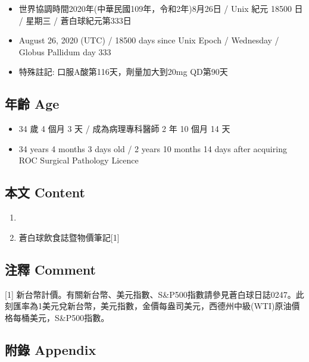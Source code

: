 \documentclass[a5paper, 11pt
]{book}
\providecommand{\tightlist}{%
  \setlength{\itemsep}{0pt}\setlength{\parskip}{0pt}}
\begin{document}
\begin{itemize}
\tightlist
\item
  世界協調時間2020年(中華民國109年，令和2年)8月26日 / Unix 紀元 18500 日
  / 星期三 / 蒼白球紀元第333日
\item
  August 26, 2020 (UTC) / 18500 days since Unix Epoch / Wednesday /
  Globus Pallidum day 333
\item
  特殊註記: 口服A酸第116天，劑量加大到20mg QD第90天
\end{itemize}

\hypertarget{ux5e74ux9f61-age-86}{%
\subsection{年齡 Age}\label{ux5e74ux9f61-age-86}}

\begin{itemize}
\tightlist
\item
  34 歲 4 個月 3 天 / 成為病理專科醫師 2 年 10 個月 14 天
\item
  34 years 4 months 3 days old / 2 years 10 months 14 days after
  acquiring ROC Surgical Pathology Licence
\end{itemize}

\hypertarget{ux672cux6587-content-86}{%
\subsection{本文 Content}\label{ux672cux6587-content-86}}

\begin{enumerate}
\def\labelenumi{\arabic{enumi}.}
\tightlist
\item
\item
  蒼白球飲食誌暨物價筆記{[}1{]}
\end{enumerate}

\hypertarget{ux6ce8ux91cb-comment-86}{%
\subsection{注釋 Comment}\label{ux6ce8ux91cb-comment-86}}

{[}1{]}
新台幣計價。有關新台幣、美元指數、S\&P500指數請參見蒼白球日誌0247。此刻匯率為1美元兌新台幣，美元指數，金價每盎司美元，西德州中級(WTI)原油價格每桶美元，S\&P500指數。

\hypertarget{ux9644ux9304-appendix-86}{%
\subsection{附錄 Appendix}\label{ux9644ux9304-appendix-86}}
\end{document}
